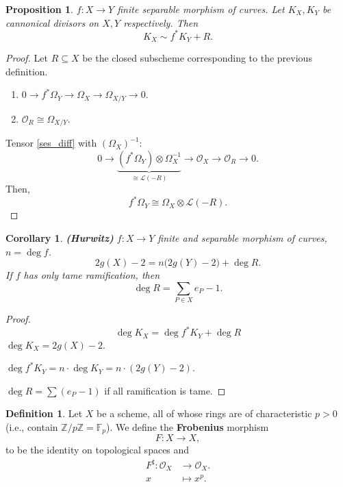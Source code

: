\documentclass[12pt]{article}
\newtheorem*{proposition}{Proposition}
\newtheorem*{corollary}{Corollary}
\theoremstyle{definition}
\newtheorem*{definition}{Definition}
\theoremstyle{remark}
\newtheorem*{comment}{Comment}
\begin{document}
\begin{proposition}
$f:X\rightarrow Y$ finite separable morphism of curves. Let $K_X,K_Y$ be cannonical divisors on $X,Y$ respectively. Then
\[K_X\sim f^*K_Y+R.\]
\end{proposition}

\begin{proof}
Let $R\subseteq X$ be the closed subscheme corresponding to the previous definition.
\begin{enumerate}[label=\arabic*)]
\item\label{ses_diff} $0\longrightarrow f^*\Omega_Y\longrightarrow\Omega_X\longrightarrow\Omega_{X/Y}\longrightarrow0$.
\item $\mathcal{O}_R\cong\Omega_{X/Y}$.
\end{enumerate}

Tensor \ref{ses_diff} with $(\Omega_X)^{-1}$:
\[0\longrightarrow\underbrace{(f^*\Omega_Y)\otimes\Omega_X^{-1}}_{\cong\mathcal{L}(-R)}\longrightarrow\mathcal{O}_X\longrightarrow\mathcal{O}_R\longrightarrow0.\]
Then,
\[f^*\Omega_Y\cong\Omega_X\otimes\mathcal{L}(-R).\]
\end{proof}

\begin{corollary}
\emph{\textbf{(Hurwitz)}} $f:X\rightarrow Y$ finite and separable morphism of curves, $n=\deg f$.
\[2g(X)-2=n\big(2g(Y)-2\big)+\deg R.\]
If $f$ has only tame ramification, then
\[\deg R=\sum_{P\in X}e_P-1.\]
\end{corollary}

\begin{comment}
It seems an infinite sum, but for all but finitely many points $e_P=1$.
\end{comment}

\begin{proof}
\[\deg K_X=\deg f^*K_Y+\deg R\]
$\deg K_X=2g(X)-2$.

$\deg f^*K_Y=n\cdot\deg K_Y=n\cdot(2g(Y)-2)$.

$\deg R=\sum(e_P-1)$ if all ramification is tame.
\end{proof}

\begin{definition}
Let $X$ be a scheme, all of whose rings are of characteristic $p>0$ (i.e., contain $\mathbb{Z}/p\mathbb{Z}=\mathbb{F}_p$). We define the \textbf{Frobenius} morphism
\[F:X\longrightarrow X,\]
to be the identity on topological spaces and
\begin{align*}\tag{$p$-th power map}
F^{\sharp}:\mathcal{O}_X&\longrightarrow\mathcal{O}_X.\\
x&\longmapsto x^p.
\end{align*}
\end{definition}
\end{document}
